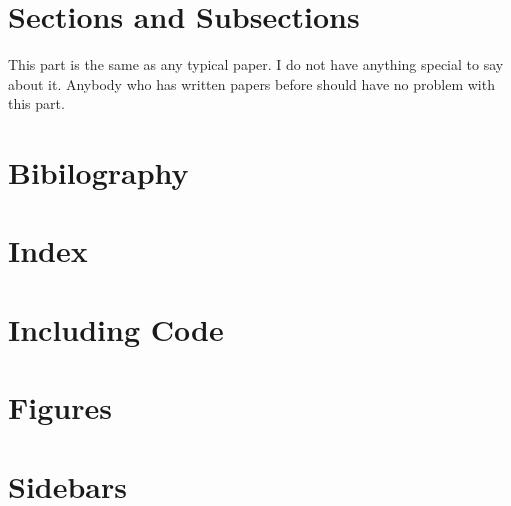 \section{Sections and Subsections} 

This part is the same as any typical paper. I do not have anything special
to say about it. Anybody who has written papers before should have no problem with 
this part.




\section{Bibilography}




\section{Index}




\section{Including Code}




\section{Figures}




\section{Sidebars} 




